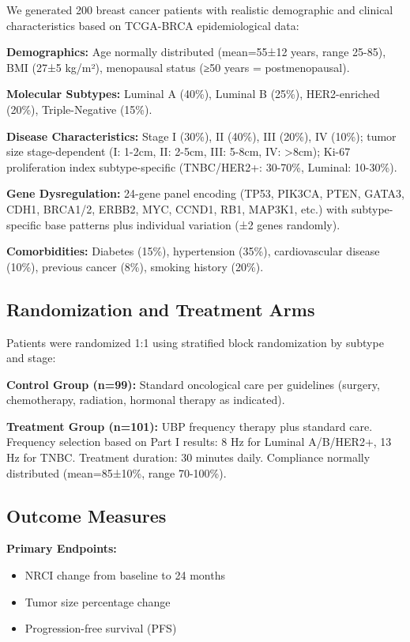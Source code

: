 \documentclass[12pt,a4paper]{article}
\begin{document}
We generated 200 breast cancer patients with realistic demographic and clinical characteristics based on TCGA-BRCA epidemiological data:

\textbf{Demographics:} Age normally distributed (mean=55±12 years, range 25-85), BMI (27±5 kg/m²), menopausal status (≥50 years = postmenopausal).

\textbf{Molecular Subtypes:} Luminal A (40\%), Luminal B (25\%), HER2-enriched (20\%), Triple-Negative (15\%).

\textbf{Disease Characteristics:} Stage I (30\%), II (40\%), III (20\%), IV (10\%); tumor size stage-dependent (I: 1-2cm, II: 2-5cm, III: 5-8cm, IV: >8cm); Ki-67 proliferation index subtype-specific (TNBC/HER2+: 30-70\%, Luminal: 10-30\%).

\textbf{Gene Dysregulation:} 24-gene panel encoding (TP53, PIK3CA, PTEN, GATA3, CDH1, BRCA1/2, ERBB2, MYC, CCND1, RB1, MAP3K1, etc.) with subtype-specific base patterns plus individual variation (±2 genes randomly).

\textbf{Comorbidities:} Diabetes (15\%), hypertension (35\%), cardiovascular disease (10\%), previous cancer (8\%), smoking history (20\%).

\subsection{Randomization and Treatment Arms}

Patients were randomized 1:1 using stratified block randomization by subtype and stage:

\textbf{Control Group (n=99):} Standard oncological care per guidelines (surgery, chemotherapy, radiation, hormonal therapy as indicated).

\textbf{Treatment Group (n=101):} UBP frequency therapy plus standard care. Frequency selection based on Part I results: 8 Hz for Luminal A/B/HER2+, 13 Hz for TNBC. Treatment duration: 30 minutes daily. Compliance normally distributed (mean=85±10\%, range 70-100\%).

\subsection{Outcome Measures}

\textbf{Primary Endpoints:}
\begin{itemize}
\item NRCI change from baseline to 24 months
\item Tumor size percentage change
\item Progression-free survival (PFS)
\end{itemize}
\end{document}
